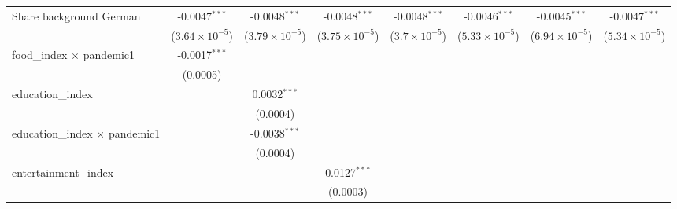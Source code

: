 \begin{table}[htbp]
\begin{threeparttable}[b]
\begin{tabular}{lccccccc}
         Share background German                    & -0.0047$^{***}$         & -0.0048$^{***}$         & -0.0048$^{***}$         & -0.0048$^{***}$        & -0.0046$^{***}$         & -0.0045$^{***}$         & -0.0047$^{***}$\\   
                                                    & ($3.64\times 10^{-5}$)  & ($3.79\times 10^{-5}$)  & ($3.75\times 10^{-5}$)  & ($3.7\times 10^{-5}$)  & ($5.33\times 10^{-5}$)  & ($6.94\times 10^{-5}$)  & ($5.34\times 10^{-5}$)\\    
         food\_index $\times$ pandemic1             & -0.0017$^{***}$         &                         &                         &                        &                         &                         &   \\   
                                                    & (0.0005)                &                         &                         &                        &                         &                         &   \\   
         education\_index                           &                         & 0.0032$^{***}$          &                         &                        &                         &                         &   \\   
                                                    &                         & (0.0004)                &                         &                        &                         &                         &   \\   
         education\_index $\times$ pandemic1        &                         & -0.0038$^{***}$         &                         &                        &                         &                         &   \\   
                                                    &                         & (0.0004)                &                         &                        &                         &                         &   \\   
         entertainment\_index                       &                         &                         & 0.0127$^{***}$          &                        &                         &                         &   \\   
                                                    &                         &                         & (0.0003)                &                        &                         &                         &   \\   

\end{tabular}
\end{threeparttable}
\end{table}
